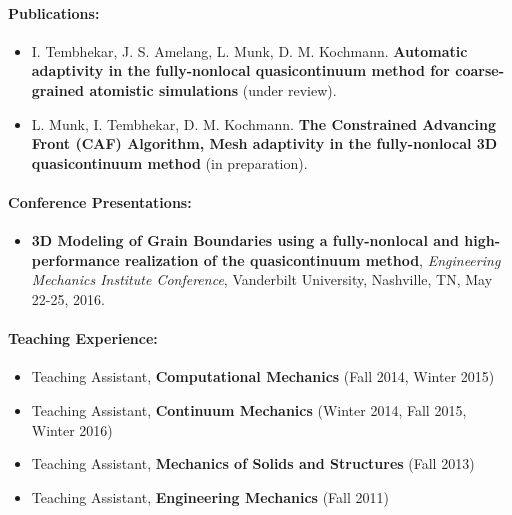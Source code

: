 \documentclass[10pt,fleqn]{article}
\begin{document}
\vspace{-10pt}
\paragraph*{Publications:}
\vspace{-10pt}
\begin{itemize}
\setlength{\itemsep}{8pt}
\setlength{\parskip}{0pt}
\item I. Tembhekar, J. S. Amelang, L. Munk, D. M. Kochmann. \textbf{Automatic adaptivity in the fully-nonlocal quasicontinuum method for coarse-grained atomistic simulations} (under review).
\item  L. Munk, I. Tembhekar, D. M. Kochmann. \textbf{The Constrained Advancing Front (CAF) Algorithm, Mesh adaptivity in the fully-nonlocal 3D quasicontinuum method} (in preparation).
\end{itemize}
\paragraph*{Conference Presentations:}
\vspace{-10pt}
\begin{itemize}
\setlength{\itemsep}{8pt}
\setlength{\parskip}{0pt}
\item \textbf{3D Modeling of Grain Boundaries using a fully-nonlocal and high-performance realization of the quasicontinuum method}, \emph{Engineering Mechanics Institute Conference}, Vanderbilt University, Nashville, TN, May 22-25, 2016.
\end{itemize}
\paragraph*{Teaching Experience:}
\vspace{-10pt}
\begin{itemize}
\setlength{\itemsep}{0pt}
\setlength{\parskip}{0pt}
\item Teaching Assistant, \textbf{Computational Mechanics} (Fall 2014, Winter 2015)
\item Teaching Assistant, \textbf{Continuum Mechanics} (Winter 2014, Fall 2015, Winter 2016)
\item Teaching Assistant, \textbf{Mechanics of Solids and Structures} (Fall 2013)
\item Teaching Assistant, \textbf{Engineering Mechanics} (Fall 2011)
\end{itemize}
\vspace{-10pt}
\end{document}

